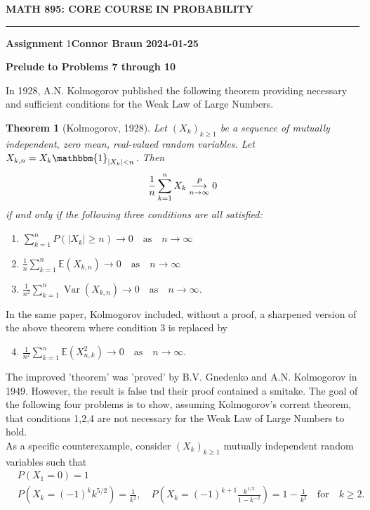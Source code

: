 \documentclass[10pt]{article}
\newcommand{\E}{\mathbb{E}}
\newcommand{\bp}[1]{\left({#1}\right)}
\newcommand{\1}[1]{\mathbbm{1}_{#1}}
\DeclareMathOperator{\Var}{Var}
\newtheorem{theorem}{Theorem}
\begin{document}
    \begin{center}
        {\bf\large{MATH 895: CORE COURSE IN PROBABILITY}}
        \smallskip
        \hrule
        \smallskip
        {\bf Assignment} 1\hfill {\bf Connor Braun} \hfill {\bf 2024-01-25}
    \end{center}
    \noindent\begin{center}
        {\bf Prelude to Problems 7 through 10}
    \end{center}
    In 1928, A.N. Kolmogorov published the following theorem providing necessary and sufficient conditions for the Weak Law of Large Numbers.
    \begin{theorem}[Kolmogorov, 1928]
        Let $(X_k)_{k\geq 1}$ be a sequence of mutually independent, zero mean, real-valued random variables. Let $X_{k,n}=X_k\1{|X_k|<n}$. Then
        \[\frac{1}{n}\sum_{k=1}^nX_k\overunderset{P}{n\rightarrow\infty}{\longrightarrow} 0\]
        if and only if the following three conditions are all satisfied:
        \begin{enumerate}
            \item $\sum_{k=1}^nP(|X_k|\geq n)\rightarrow 0\quad\text{as}\quad n\rightarrow\infty$
            \item $\frac{1}{n}\sum_{k=1}^n\E(X_{k,n})\rightarrow 0\quad\text{as}\quad n\rightarrow\infty$
            \item $\frac{1}{n^2}\sum_{k=1}^n\Var(X_{k,n})\rightarrow 0\quad\text{as}\quad n\rightarrow\infty$.
        \end{enumerate}
    \end{theorem}
    \noindent In the same paper, Kolmogorov included, without a proof, a sharpened version of the above theorem where condition $3$ is replaced by
    \begin{enumerate}
        \setcounter{enumi}{3}
        \item $\frac{1}{n^2}\sum_{k=1}^n\E(X_{n,k}^2)\rightarrow 0\quad\text{as}\quad n\rightarrow\infty$.
    \end{enumerate}
    The improved 'theorem' was 'proved' by B.V. Gnedenko and A.N. Kolmogorov in 1949. However, the result is false tnd their proof contained a smitake. The goal of the following four problems is to show, assuming Kolmogorov's corrent theorem, that conditions 1,2,4 
    are not necessary for the Weak Law of Large Numbers to hold.\\[5pt]
    As a specific counterexample, consider $(X_k)_{k\geq 1}$ mutually independent random variables such that
    \begin{align*}
        &P(X_1=0)=1\\
        &P\bp{X_k=(-1)^kk^{5/2}}=\frac{1}{k^2},\quad P\bp{X_k=(-1)^{k+1}\frac{k^{1/2}}{1-k^{-2}}}=1-\frac{1}{k^2}\quad\text{for}\quad k\geq 2.\tag{16}
    \end{align*} 
\end{document}
